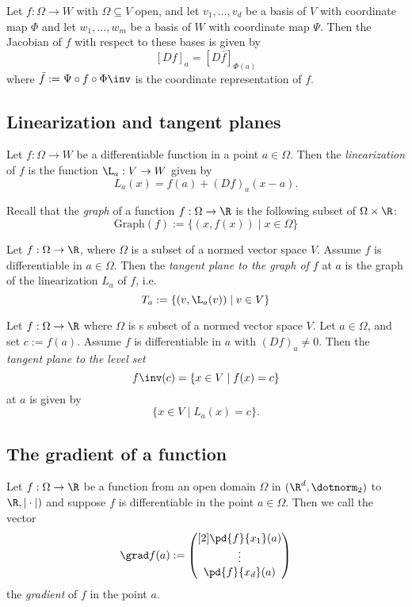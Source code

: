\begin{proposition}
    Let $f:\Omega \to W$ with $\Omega \subseteq V$ open, and let $v_1,\dots,v_d$ be a basis of $V$
    with coordinate map $\Phi$ and let $w_1,\dots,w_m$ be a basis of $W$ with coordinate map $\Psi$.
    Then the Jacobian of $f$ with respect to these bases is given by
    $$[Df]_a = [D\bar{f}]_{\Phi(a)}$$
    where $\bar{f} := \Psi \circ f \circ \Phi\inv$ is the coordinate representation of $f$.
\end{proposition}

\subsection{Linearization and tangent planes}
\begin{definition}[Linearization]
    Let $f:\Omega\to W$ be a differentiable function in a point $a \in \Omega$. Then the \emph{linearization}
    of $f$ is the function $\L_a: V \to W$ given by
    $$L_a(x) = f(a) + (Df)_a(x-a).$$
\end{definition}

Recall that the \emph{graph} of a function $f:\Omega \to \R$ is the following subset of $\Omega \times \R$:
$$\text{Graph}(f) := \{(x,f(x)) \mid x \in \Omega \}$$

\begin{definition}
    Let $f:\Omega \to \R$, where $\Omega$ is a subset of a normed vector space $V$. Assume $f$ is
    differentiable in $a \in \Omega$. Then the \emph{tangent plane to the graph of $f$} at $a$ is
    the graph of the linearization $L_a$ of $f$, i.e.
    $$T_a := \{(v, \L_a(v)) \mid v \in V \}$$
\end{definition}

\begin{definition}
    Let $f: \Omega \to \R$ where $\Omega$ is s subset of a normed vector space $V$. Let $a \in \Omega$, and
    set $c:=f(a)$. Assume $f$ is differentiable in $a$ with $(Df)_a \ne 0$. Then the \emph{tangent plane to the level set}
    $$f\inv(c) = \{x \in V \mid f(x) = c\}$$
    at $a$ is given by
    $$\{x \in V \mid L_a(x) = c\}.$$
\end{definition}

\subsection{The gradient of a function}
\begin{definition}[Gradient]
    Let $f: \Omega \to \R$ be a function from an open domain $\Omega$ in $(\R^d, \dotnorm_2)$ to $\R, |\cdot|)$ and
    suppose $f$ is differentiable in the point $a \in \Omega$. Then we call the vector
    $$\grad f(a) := \begin{pmatrix}[2] \pd{f}{x_1}(a) \\ \vdots \\ \pd{f}{x_d}(a) \end{pmatrix}$$
    the \emph{gradient} of $f$ in the point $a$.
\end{definition}

